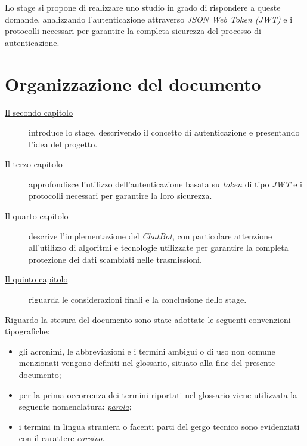 Lo stage si propone di realizzare uno studio in grado di rispondere a queste domande, analizzando l'autenticazione attraverso \emph{JSON Web Token (JWT)} e i protocolli necessari per garantire la completa sicurezza del processo di autenticazione.


\section{Organizzazione del documento}
\label{sec:organizzazione-documento}

\begin{description}
    \item[{\hyperref[cap:inquadramento-stage]{Il secondo capitolo}}] introduce lo stage, descrivendo il concetto di autenticazione e presentando l'idea del progetto.
    
    \item[{\hyperref[cap:autenticazione-jwt]{Il terzo capitolo}}] approfondisce l'utilizzo dell'autenticazione basata su \emph{\gls{token}} di tipo \emph{JWT} e i protocolli necessari per garantire la loro sicurezza.
    
    \item[{\hyperref[cap:chatbot]{Il quarto capitolo}}] descrive l'implementazione del \emph{ChatBot}, con particolare attenzione all'utilizzo di algoritmi e tecnologie utilizzate per garantire la completa protezione dei dati scambiati nelle trasmissioni. 
    
    \item[{\hyperref[cap:conclusioni]{Il quinto capitolo}}] riguarda le considerazioni finali e la conclusione dello stage.
\end{description}

Riguardo la stesura del documento sono state adottate le seguenti convenzioni tipografiche:
\begin{itemize}
	\item gli acronimi, le abbreviazioni e i termini ambigui o di uso non comune menzionati vengono definiti nel glossario, situato alla fine del presente documento;
	\item per la prima occorrenza dei termini riportati nel glossario viene utilizzata la seguente nomenclatura: \emph{\hyperref[sec:organizzazione-documento]{parola}};
	\item i termini in lingua straniera o facenti parti del gergo tecnico sono evidenziati con il carattere \emph{corsivo}.
\end{itemize}
